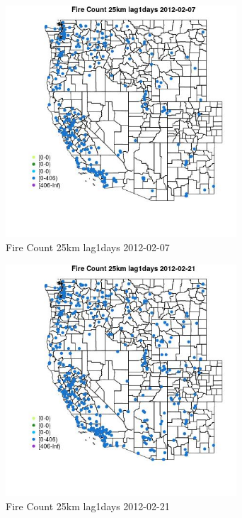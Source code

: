 \begin{figure} 
\centering  
\includegraphics[width=0.77\textwidth]{Code_Outputs/Report_ML_input_PM25_Step4_part_f_de_duplicated_aveswNAs_MapObsFire_Count_25km_lag1days2012-02-07.jpg} 
\caption{\label{fig:Report_ML_input_PM25_Step4_part_f_de_duplicated_aveswNAsMapObsFire_Count_25km_lag1days2012-02-07}Fire Count 25km lag1days 2012-02-07} 
\end{figure} 
 

\begin{figure} 
\centering  
\includegraphics[width=0.77\textwidth]{Code_Outputs/Report_ML_input_PM25_Step4_part_f_de_duplicated_aveswNAs_MapObsFire_Count_25km_lag1days2012-02-21.jpg} 
\caption{\label{fig:Report_ML_input_PM25_Step4_part_f_de_duplicated_aveswNAsMapObsFire_Count_25km_lag1days2012-02-21}Fire Count 25km lag1days 2012-02-21} 
\end{figure} 
 


